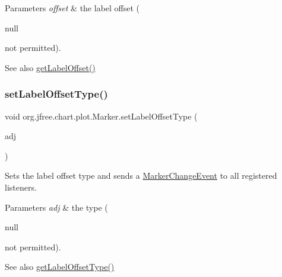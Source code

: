 \begin{DoxyParams}{Parameters}
{\em offset} & the label offset (
\begin{DoxyCode}
null 
\end{DoxyCode}
 not permitted).\\
\hline
\end{DoxyParams}
\begin{DoxySeeAlso}{See also}
\mbox{\hyperlink{classorg_1_1jfree_1_1chart_1_1plot_1_1_marker_afeb7667415110c87d2ab08965dc56bc9}{get\+Label\+Offset()}} 
\end{DoxySeeAlso}
\mbox{\label{classorg_1_1jfree_1_1chart_1_1plot_1_1_marker_a587b510f9d7c24e7761992863f97a6bf}} 
\subsubsection{\texorpdfstring{set\+Label\+Offset\+Type()}{setLabelOffsetType()}}
{\footnotesize\ttfamily void org.\+jfree.\+chart.\+plot.\+Marker.\+set\+Label\+Offset\+Type (\begin{DoxyParamCaption}\item[{Length\+Adjustment\+Type}]{adj }\end{DoxyParamCaption})}

Sets the label offset type and sends a \mbox{\hyperlink{}{Marker\+Change\+Event}} to all registered listeners.


\begin{DoxyParams}{Parameters}
{\em adj} & the type (
\begin{DoxyCode}
null 
\end{DoxyCode}
 not permitted).\\
\hline
\end{DoxyParams}
\begin{DoxySeeAlso}{See also}
\mbox{\hyperlink{classorg_1_1jfree_1_1chart_1_1plot_1_1_marker_aac843d9d59a3fb72e8043bd82eacf86c}{get\+Label\+Offset\+Type()}} 
\end{DoxySeeAlso}
\mbox{\label{classorg_1_1jfree_1_1chart_1_1plot_1_1_marker_aa2076c2fb29d173c8484f736851e6a68}} 
